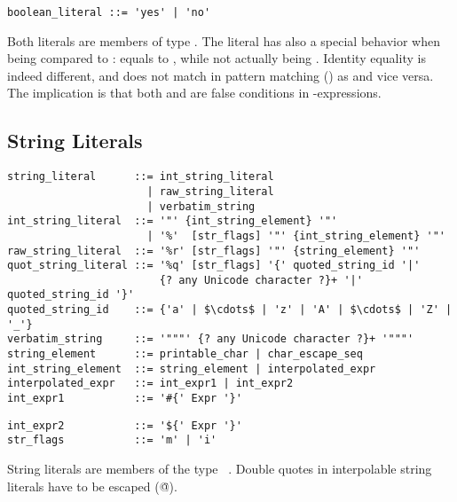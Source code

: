 \syntax\begin{lstlisting}
boolean_literal ::= 'yes' | 'no'
\end{lstlisting}

Both literals are members of type \lstinline@Boolean@. The \lstinline@no@ literal has also a special behavior when being compared to \lstinline@nil@: \lstinline@no@ equals to \lstinline@nil@, while not actually being \lstinline@nil@. Identity equality is indeed different, and  does not match in pattern matching () as  and vice versa. The implication is that both \lstinline@nil@ and \lstinline@no@ are false conditions in \lstinline@if@-expressions. 





\subsection{String Literals}
\label{sec:stringliterals}

\syntax\begin{lstlisting}
string_literal      ::= int_string_literal
                      | raw_string_literal
                      | verbatim_string
int_string_literal  ::= '"' {int_string_element} '"'
                      | '%'  [str_flags] '"' {int_string_element} '"'
raw_string_literal  ::= '%r' [str_flags] '"' {string_element} '"'
quot_string_literal ::= '%q' [str_flags] '{' quoted_string_id '|'
                        {? any Unicode character ?}+ '|' quoted_string_id '}'
quoted_string_id    ::= {'a' | $\cdots$ | 'z' | 'A' | $\cdots$ | 'Z' | '_'}
verbatim_string     ::= '"""' {? any Unicode character ?}+ '"""'
string_element      ::= printable_char | char_escape_seq
int_string_element  ::= string_element | interpolated_expr
interpolated_expr   ::= int_expr1 | int_expr2
int_expr1           ::= '#{' Expr '}'
\end{lstlisting}
\begin{lstlisting}[mathescape=false]
int_expr2           ::= '${' Expr '}'
str_flags           ::= 'm' | 'i'
\end{lstlisting}

String literals are members of the type ~\lstinline@String@. Double quotes in interpolable string literals have to be escaped (\lstinline@\"@).

